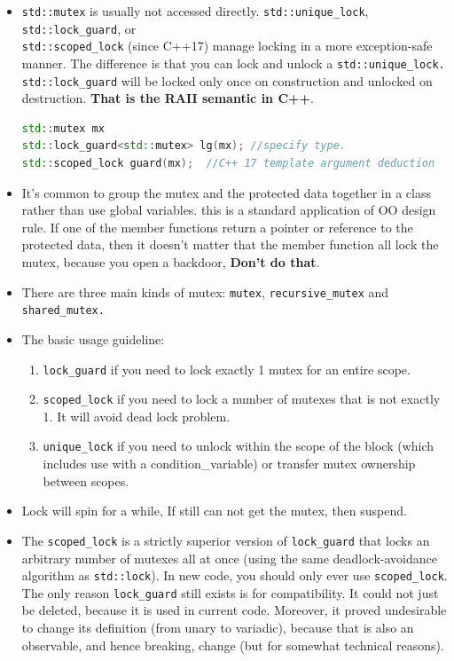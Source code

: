 \documentclass[a4paper,11pt,twoside]{book}
\begin{document}
\begin{itemize}
	\item \texttt{std::mutex} is usually not accessed directly. \texttt{std::unique\_lock}, \texttt{std::lock\_guard}, or \\ 
	\texttt{std::scoped\_lock} (since C++17) manage locking in a more exception-safe manner. The difference is that you can lock and unlock a \texttt{std::unique\_lock.} \texttt{std::lock\_guard} will be locked only once on construction and unlocked on destruction. \textbf{That is the RAII semantic in C++}.
\begin{lstlisting}[frame=single, language=c++]
std::mutex mx
std::lock_guard<std::mutex> lg(mx); //specify type.
std::scoped_lock guard(mx);  //C++ 17 template argument deduction
\end{lstlisting}

	
	\item It's common to group the mutex and the protected data together in a class rather than use global variables. this is a standard application of OO design rule. If one of the member functions return a pointer or reference to the protected data, then it doesn't matter that the member function all lock the mutex, because you open a backdoor, \textbf{Don't do that}.  

	\item There are three main kinds of mutex: \texttt{mutex}, \texttt{recursive\_mutex} and \texttt{shared\_mutex.}

	
	\item The basic usage guideline:
\begin{enumerate}
	\item \texttt{lock\_guard} if you need to lock exactly 1 mutex for an entire scope.
	\item \texttt{scoped\_lock} if you need to lock a number of mutexes that is not exactly 1. It will avoid dead lock problem.
	\item \texttt{unique\_lock} if you need to unlock within the scope of the block (which includes use with a condition\_variable) or transfer mutex ownership between scopes.
\end{enumerate}

    \item Lock will spin for a while, If still can not get the mutex, then suspend.

    \item The \texttt{scoped\_lock} is a strictly superior version of \texttt{lock\_guard} that locks an arbitrary number of mutexes all at once (using the same deadlock-avoidance algorithm as \texttt{std::lock}). In new code, you should only ever use \texttt{scoped\_lock}. The only reason \texttt{lock\_guard} still exists is for compatibility. It could not just be deleted, because it is used in current code. Moreover, it proved undesirable to change its definition (from unary to variadic), because that is also an observable, and hence breaking, change (but for somewhat technical reasons). 


\end{itemize}
\end{document}
